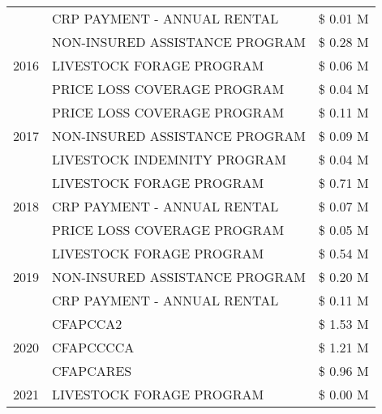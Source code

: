 \begin{tabular}{llr}
 & CRP PAYMENT - ANNUAL RENTAL & \$ 0.01 M \\
\cline{1-3}
\multirow[t]{3}{*}{2016} & NON-INSURED ASSISTANCE PROGRAM & \$ 0.28 M \\
 & LIVESTOCK FORAGE PROGRAM & \$ 0.06 M \\
 & PRICE LOSS COVERAGE PROGRAM & \$ 0.04 M \\
\cline{1-3}
\multirow[t]{3}{*}{2017} & PRICE LOSS COVERAGE PROGRAM & \$ 0.11 M \\
 & NON-INSURED ASSISTANCE PROGRAM & \$ 0.09 M \\
 & LIVESTOCK INDEMNITY PROGRAM & \$ 0.04 M \\
\cline{1-3}
\multirow[t]{3}{*}{2018} & LIVESTOCK FORAGE PROGRAM & \$ 0.71 M \\
 & CRP PAYMENT - ANNUAL RENTAL & \$ 0.07 M \\
 & PRICE LOSS COVERAGE PROGRAM & \$ 0.05 M \\
\cline{1-3}
\multirow[t]{3}{*}{2019} & LIVESTOCK FORAGE PROGRAM & \$ 0.54 M \\
 & NON-INSURED ASSISTANCE PROGRAM & \$ 0.20 M \\
 & CRP PAYMENT - ANNUAL RENTAL & \$ 0.11 M \\
\cline{1-3}
\multirow[t]{3}{*}{2020} & CFAPCCA2 & \$ 1.53 M \\
 & CFAPCCCCA & \$ 1.21 M \\
 & CFAPCARES & \$ 0.96 M \\
\cline{1-3}
2021 & LIVESTOCK FORAGE PROGRAM & \$ 0.00 M \\
\cline{1-3}
\bottomrule
\end{tabular}
